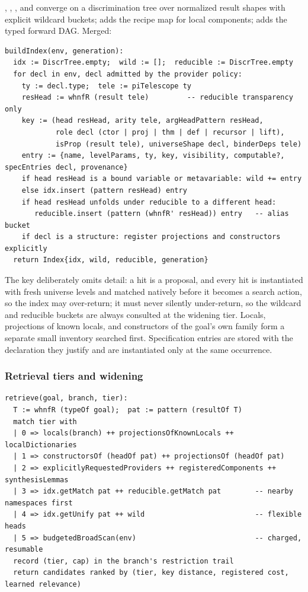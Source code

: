 , , , and  converge on a discrimination tree over normalized result shapes with explicit wildcard buckets;  adds the recipe map for local components;  adds the typed forward DAG. Merged:

\begin{lstlisting}
buildIndex(env, generation):
  idx := DiscrTree.empty;  wild := [];  reducible := DiscrTree.empty
  for decl in env, decl admitted by the provider policy:
    ty := decl.type;  tele := piTelescope ty
    resHead := whnfR (result tele)         -- reducible transparency only
    key := (head resHead, arity tele, argHeadPattern resHead,
            role decl (ctor | proj | thm | def | recursor | lift),
            isProp (result tele), universeShape decl, binderDeps tele)
    entry := {name, levelParams, ty, key, visibility, computable?, specEntries decl, provenance}
    if head resHead is a bound variable or metavariable: wild += entry
    else idx.insert (pattern resHead) entry
    if head resHead unfolds under reducible to a different head:
       reducible.insert (pattern (whnfR' resHead)) entry   -- alias bucket
    if decl is a structure: register projections and constructors explicitly
  return Index{idx, wild, reducible, generation}
\end{lstlisting}

The key deliberately omits detail: a hit is a proposal, and every hit is instantiated with fresh universe levels and matched natively before it becomes a search action, so the index may over-return; it must never silently under-return, so the wildcard and reducible buckets are always consulted at the widening tier. Locals, projections of known locals, and constructors of the goal's own family form a separate small inventory searched first. Specification entries are stored with the declaration they justify and are instantiated only at the same occurrence.

\subsubsection{Retrieval tiers and widening}

\begin{lstlisting}
retrieve(goal, branch, tier):
  T := whnfR (typeOf goal);  pat := pattern (resultOf T)
  match tier with
  | 0 => locals(branch) ++ projectionsOfKnownLocals ++ localDictionaries
  | 1 => constructorsOf (headOf pat) ++ projectionsOf (headOf pat)
  | 2 => explicitlyRequestedProviders ++ registeredComponents ++ synthesisLemmas
  | 3 => idx.getMatch pat ++ reducible.getMatch pat        -- nearby namespaces first
  | 4 => idx.getUnify pat ++ wild                          -- flexible heads
  | 5 => budgetedBroadScan(env)                            -- charged, resumable
  record (tier, cap) in the branch's restriction trail
  return candidates ranked by (tier, key distance, registered cost, learned relevance)
\end{lstlisting}

